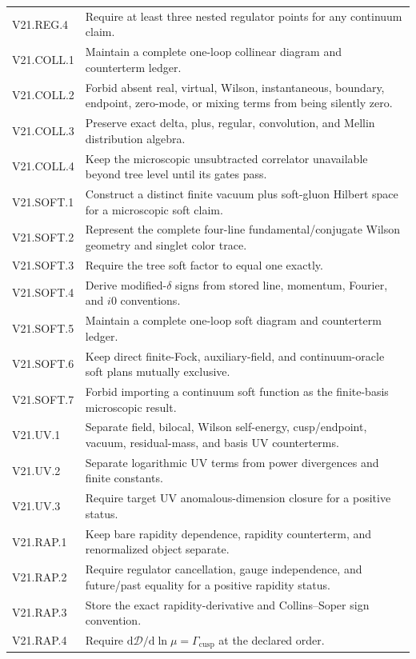 \documentclass[11pt]{article}
\newcommand{\dd}{\mathrm{d}}
\newcommand{\cD}{\mathcal D}
\begin{document}
\begin{longtable}{L{0.19\textwidth}L{0.72\textwidth}}
V21.REG.4 & Require at least three nested regulator points for any continuum claim.\\
V21.COLL.1 & Maintain a complete one-loop collinear diagram and counterterm ledger.\\
V21.COLL.2 & Forbid absent real, virtual, Wilson, instantaneous, boundary, endpoint, zero-mode, or mixing terms from being silently zero.\\
V21.COLL.3 & Preserve exact delta, plus, regular, convolution, and Mellin distribution algebra.\\
V21.COLL.4 & Keep the microscopic unsubtracted correlator unavailable beyond tree level until its gates pass.\\
V21.SOFT.1 & Construct a distinct finite vacuum plus soft-gluon Hilbert space for a microscopic soft claim.\\
V21.SOFT.2 & Represent the complete four-line fundamental/conjugate Wilson geometry and singlet color trace.\\
V21.SOFT.3 & Require the tree soft factor to equal one exactly.\\
V21.SOFT.4 & Derive modified-\(\delta\) signs from stored line, momentum, Fourier, and \(i0\) conventions.\\
V21.SOFT.5 & Maintain a complete one-loop soft diagram and counterterm ledger.\\
V21.SOFT.6 & Keep direct finite-Fock, auxiliary-field, and continuum-oracle soft plans mutually exclusive.\\
V21.SOFT.7 & Forbid importing a continuum soft function as the finite-basis microscopic result.\\
V21.UV.1 & Separate field, bilocal, Wilson self-energy, cusp/endpoint, vacuum, residual-mass, and basis UV counterterms.\\
V21.UV.2 & Separate logarithmic UV terms from power divergences and finite constants.\\
V21.UV.3 & Require target UV anomalous-dimension closure for a positive status.\\
V21.RAP.1 & Keep bare rapidity dependence, rapidity counterterm, and renormalized object separate.\\
V21.RAP.2 & Require regulator cancellation, gauge independence, and future/past equality for a positive rapidity status.\\
V21.RAP.3 & Store the exact rapidity-derivative and Collins--Soper sign convention.\\
V21.RAP.4 & Require \(\dd\cD/\dd\ln\mu=\Gamma_{\mathrm{cusp}}\) at the declared order.\\

\end{longtable}
\end{document}
